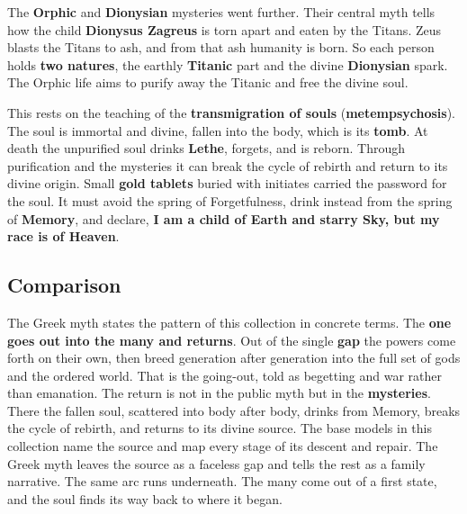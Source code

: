 The \textbf{Orphic} and \textbf{Dionysian} mysteries went further. Their central
myth tells how the child \textbf{Dionysus Zagreus} is torn apart and eaten by the
Titans. Zeus blasts the Titans to ash, and from that ash humanity is born. So each
person holds \textbf{two natures}, the earthly \textbf{Titanic} part and the
divine \textbf{Dionysian} spark. The Orphic life aims to purify away the Titanic
and free the divine soul.

This rests on the teaching of the
\textbf{transmigration of souls} (\textbf{metempsychosis}). The soul is immortal and divine, fallen into the
body, which is its \textbf{tomb}. At death the unpurified soul drinks
\textbf{Lethe}, forgets, and is reborn. Through purification and the mysteries it
can break the cycle of rebirth and return to its divine origin. Small
\textbf{gold tablets} buried with initiates carried the password for the soul. It
must avoid the spring of Forgetfulness, drink instead from the spring of
\textbf{Memory}, and declare, \textbf{I am a child of Earth and starry Sky, but my
race is of Heaven}.

\subsection{Comparison}

The Greek myth states the pattern of this collection in concrete terms. The
\textbf{one goes out into the many and returns}. Out of the single \textbf{gap}
the powers come forth on their own, then breed generation after generation into
the full set of gods and the ordered world. That is the going-out, told as
begetting and war rather than emanation. The return is not in the public myth but
in the \textbf{mysteries}. There the fallen soul, scattered into body after body,
drinks from Memory, breaks the cycle of rebirth, and returns to its divine source.
The base models in this collection name the source and map every stage of its
descent and repair. The Greek myth leaves the source as a faceless gap and tells
the rest as a family narrative. The same arc runs underneath. The many come out
of a first state, and the soul finds its way back to where it began.
